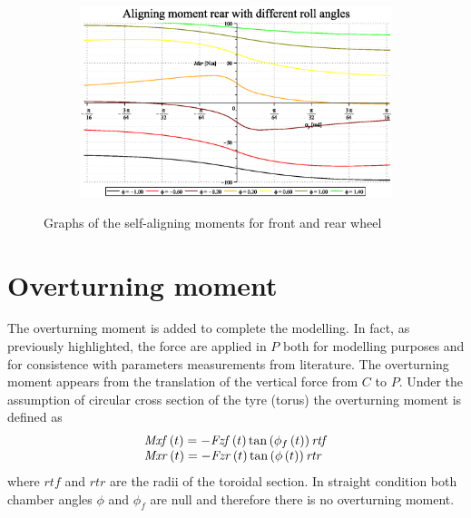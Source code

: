 \begin{figure}
\begin{subfigure}{.5\textwidth}
        \caption{}
        \label{fig:sa1c}
    \end{subfigure}%
    \begin{subfigure}{.5\textwidth}
        \includegraphics[width=\linewidth]{MotoModel_tex/MotoModelplot2d14.eps}
        \caption{}
        \label{fig:sa1d}
    \end{subfigure}
    \caption{Graphs of the self-aligning moments for front and rear wheel}
\end{figure}
%

%
\section{Overturning moment}
%
The overturning moment is added to complete the modelling. In fact, as previously highlighted, the force are applied in $P$ both for modelling purposes and for consistence with parameters measurements from literature\cite{pacejka2012tire,sharp2014method}. The overturning moment appears from the translation of the vertical force from $C$ to $P$. Under the assumption of circular cross section of the tyre (torus) the overturning moment is defined as
%
\begin{equation}
    \begin{array}{l} {\it Mxf} \left( t \right) =-{\it Fzf}
    \left( t \right) \tan \left( \phi_{f} \left( t \right)  \right) {\it 
   rtf}\\ {\it Mxr} \left( t \right) =-{\it Fzr}
    \left( t \right) \tan \left( \phi \left( t \right)  \right) {\it rtr}
   \end{array}  
\end{equation}
%
where $rtf$ and $rtr$ are the radii of the toroidal section. In straight condition both chamber angles $\phi$ and $\phi_f$ are null and therefore there is no overturning moment. 
%
